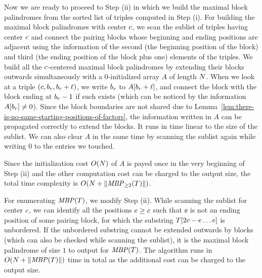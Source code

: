 Now we are ready to proceed to Step (ii) in which we build the maximal block palindromes from the sorted list of triples computed in Step (i).
For building the maximal block palindromes with center $c$,
we scan the sublist of triples having center $c$ and connect the pairing blocks whose beginning and ending positions are adjacent
using the information of the second (the beginning position of the block) and third (the ending position of the block plus one) elements of the triples.
We build all the $c$-centered maximal block palindromes by extending their blocks outwards simultaneously
with a $0$-initialized array $A$ of length $N$.
When we look at a triple $(c, b_{r}, b_{r} + \ell)$,
we write $b_{r}$ to $A[b_{r} + \ell]$, and connect the block with the block ending at $b_{r} - 1$ if such exists
(which can be noticed by the information $A[b_{r}] \neq 0$).
Since the block boundaries are not shared due to Lemma~\ref{lem:there-is-no-same-starting-positions-of-factors},
the information written in $A$ can be propagated correctly to extend the blocks.
It runs in time linear to the size of the sublist.
We can also clear $A$ in the same time by scanning the sublist again while writing $0$ to the entries we touched.

Since the initialization cost $O(N)$ of $A$ is payed once in the very beginning of Step (ii)
and the other computation cost can be charged to the output size, the total time complexity is $O(N + \|\mathit{MBP}_{\ge 2}(T)\|)$.

For enumerating $\mathit{MBP}(T)$, we modify Step (ii).
While scanning the sublist for center $c$,
we can identify all the positions $e \ge c$ such that $\ee$ is not an ending position of some pairing block,
for which the substring $T[2 c - e \ldots e]$ is unbordered.
If the unbordered substring cannot be extended outwards by blocks (which can also be checked while scanning the sublist),
it is the maximal block palindrome of size $1$ to output for $\mathit{MBP}(T)$.
The algorithm runs in $O(N + \|\mathit{MBP}(T)\|)$ time in total as the additional cost can be charged to the output size.


